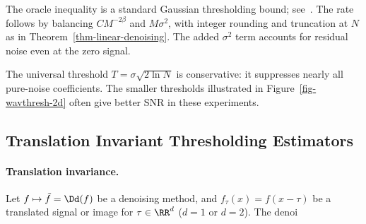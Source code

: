 The oracle inequality is a standard Gaussian thresholding bound; see~\cite{donoho-shrinkage}. The rate follows by balancing $CM^{-2\beta}$ and $M\sigma^2$, with integer rounding and truncation at $N$ as in Theorem~\ref{thm-linear-denoising}. The added $\sigma^2$ term accounts for residual noise even at the zero signal.

The universal threshold $T=\sigma\sqrt{2\ln N}$ is conservative: it suppresses nearly all pure-noise coefficients. The smaller thresholds illustrated in Figure~\ref{fig-wavthresh-2d} often give better SNR in these experiments.

                                                     
\subsection{Translation Invariant Thresholding Estimators}

  
\paragraph{Translation invariance.}

Let $f\mapsto\tilde f=\Dd(f)$ be a denoising method, and $f_\tau(x) = f(x-\tau)$ be a translated signal or image for $\tau \in \RR^d$ ($d=1$ or $d=2$).
The denoi